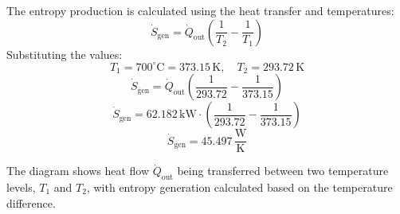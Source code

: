 The entropy production is calculated using the heat transfer and temperatures:  
\[
\dot{S}_{\text{gen}} = \dot{Q}_{\text{out}} \left(\frac{1}{T_2} - \frac{1}{T_1}\right)
\]  
Substituting the values:  
\[
T_1 = 700^\circ\text{C} = 373.15 \, \text{K}, \quad T_2 = 293.72 \, \text{K}
\]  
\[
\dot{S}_{\text{gen}} = \dot{Q}_{\text{out}} \left(\frac{1}{293.72} - \frac{1}{373.15}\right)
\]  
\[
\dot{S}_{\text{gen}} = 62.182 \, \text{kW} \cdot \left(\frac{1}{293.72} - \frac{1}{373.15}\right)
\]  
\[
\dot{S}_{\text{gen}} = 45.497 \, \frac{\text{W}}{\text{K}}
\]  

The diagram shows heat flow \( \dot{Q}_{\text{out}} \) being transferred between two temperature levels, \( T_1 \) and \( T_2 \), with entropy generation calculated based on the temperature difference.